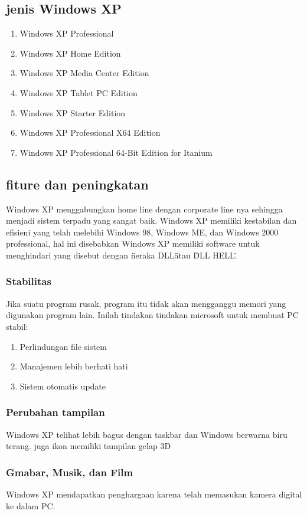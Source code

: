 \begin{enumerate}
		\subsection{jenis Windows XP}
\begin{enumerate}
			\item Windows XP Professional
			\item Windows XP Home Edition
			\item Windows XP Media Center Edition
			\item Windows XP Tablet PC Edition
			\item Windows XP Starter Edition
			\item Windows XP Professional X64 Edition
			\item Windows XP Professional 64-Bit Edition for Itanium
\end{enumerate}
		\subsection{fiture dan peningkatan}
			Windows XP menggabungkan home line dengan corporate line nya sehingga menjadi sistem terpadu yang sangat baik. Windows XP memiliki kestabilan dan efisieni yang telah melebihi Windows 98, Windows ME, dan Windows 2000 professional, hal ini disebabkan Windows XP memiliki software untuk menghindari yang disebut dengan \"neraka DLL\" atau \"DLL HELL\".
			\subsubsection{Stabilitas}
				Jika suatu program rusak, program itu tidak akan mengganggu memori yang digunakan program lain. Inilah tindakan tindakan microsoft untuk membuat PC stabil:
\begin{enumerate}
		 			\item Perlindungan file sistem
		 			\item Manajemen lebih berhati hati
		 			\item Sistem otomatis update
\end{enumerate}
			\subsubsection{Perubahan tampilan}
				Windows XP telihat lebih bagus dengan taskbar dan Windows berwarna biru terang. juga ikon memiliki tampilan gelap 3D
			\subsubsection{Gmabar, Musik, dan Film}
				Windows XP mendapatkan penghargaan karena telah memasukan kamera digital ke dalam PC.

\end{enumerate}
